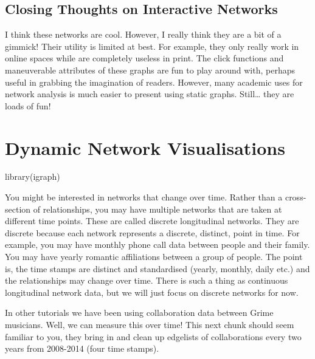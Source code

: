 \documentclass[
  letterpaper,
  DIV=11,
  numbers=noendperiod]{scrreprt}
\newenvironment{Shaded}{\begin{snugshade}}{\end{snugshade}}
\newcommand{\FunctionTok}[1]{\textcolor[rgb]{0.28,0.35,0.67}{#1}}
\newcommand{\NormalTok}[1]{\textcolor[rgb]{0.00,0.23,0.31}{#1}}
\begin{document}
\section{Closing Thoughts on Interactive
Networks}\label{closing-thoughts-on-interactive-networks}

I think these networks are cool. However, I really think they are a bit
of a gimmick! Their utility is limited at best. For example, they only
really work in online spaces while are completely useless in print. The
click functions and maneuverable attributes of these graphs are fun to
play around with, perhaps useful in grabbing the imagination of readers.
However, many academic uses for network analysis is much easier to
present using static graphs. Still\ldots{} they are loads of fun!

\chapter{Dynamic Network
Visualisations}\label{dynamic-network-visualisations}

\begin{Shaded}
\begin{Highlighting}[]
\FunctionTok{library}\NormalTok{(igraph)}
\end{Highlighting}
\end{Shaded}

You might be interested in networks that change over time. Rather than a
cross-section of relationships, you may have multiple networks that are
taken at different time points. These are called discrete longitudinal
networks. They are discrete because each network represents a discrete,
distinct, point in time. For example, you may have monthly phone call
data between people and their family. You may have yearly romantic
affiliations between a group of people. The point is, the time stamps
are distinct and standardised (yearly, monthly, daily etc.) and the
relationships may change over time. There is such a thing as continuous
longitudinal network data, but we will just focus on discrete networks
for now.

In other tutorials we have been using collaboration data between Grime
musicians. Well, we can measure this over time! This next chunk should
seem familiar to you, they bring in and clean up edgelists of
collaborations every two years from 2008-2014 (four time stamps).
\end{document}
